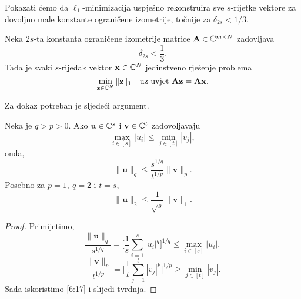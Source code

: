 \documentclass[a4paper,twoside,12pt]{memoir} %
\newcommand{\vect}[1]{\mathbf{#1}}
\renewcommand{\vec}{\vect}
\newcommand{\norm}[1]{\|{#1}\|}
\begin{document}
Pokazati \'cemo da $\ell_1$-minimizacija uspje\v{s}no rekonstruira sve $s$-rijetke vektore za dovoljno male konstante ograni\v{c}ene izometrije, to\v{c}nije za $\delta_{2s} < 1/3$.

\begin{thm}\label{tm:6:9} 
    Neka $2s$-ta konstanta ograni\v{c}ene izometrije matrice $\vec A \in \C^{m \times N}$ zadovljava 
    \begin{equation}\label{6:16}
        \delta_{2s} < \frac{1}{3} .
    \end{equation}
    Tada je svaki $s$-rijedak vektor $\vec x \in \C^N$ jedinstveno rje\v{s}enje problema 
    \begin{equation*}
        \min_{\vec z \in \C^N} \norm{\vec z}_1 \quad \text{uz uvjet } \vec{Az} = \vec{Ax}. 
    \end{equation*}
\end{thm}
Za dokaz potreban je sljede\'ci argument.
\begin{lem}\label{lem:6:10}
    Neka je $q > p > 0$. Ako $\vec u \in \C^s$ i $\vec v \in \C^t$ zadovoljavaju 
    \begin{equation}\label{6:17}
        \max_{i \in [s]} |u_i| \leq \min_{j \in [t]} |v_j|, 
    \end{equation}
    onda,
    \begin{equation*}
        \norm{\vec u}_q \leq \frac{s^{1/q}}{t^{1/p}} \norm{\vec v}_p.
    \end{equation*}
    Posebno za $p = 1,\  q = 2$ i $t = s$,
    \begin{equation*}
        \norm{\vec u}_2 \leq \frac{1}{\sqrt{s}} \norm{\vec v}_1.
    \end{equation*}
\end{lem}
\begin{proof}
    Primijetimo,
    \begin{equation*}
        \frac{\norm{\vec u}_q}{s^{1/q}} = \bigg[ \frac{1}{s} \sum_{i=1}^s |u_i|^q  \bigg]^{1/q} \leq \max_{i \in [s]} |u_i|, 
    \end{equation*}
    \begin{equation*}
        \frac{\norm{\vec v}_p}{t^{1/p}} = \bigg[ \frac{1}{t} \sum_{j=1}^t |v_j|^p  \bigg]^{1/p} \geq \min_{j \in [t]} |v_j|.
    \end{equation*}
    Sada iskoristimo \eqref{6:17} i slijedi tvrdnja.
\end{proof}
\end{document}
